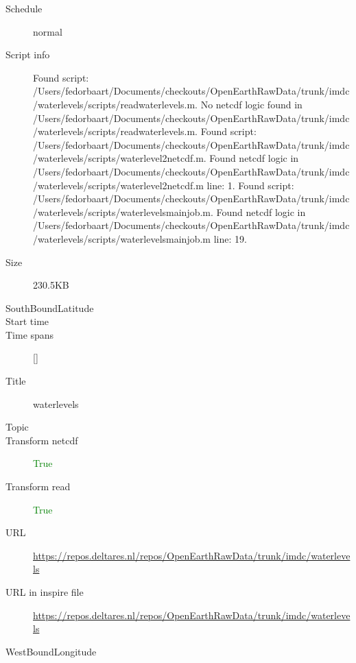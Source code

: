 \documentclass[9]{report}
\begin{document}
\begin{description}
\begin{verbatim}
\end{verbatim}
  \item[Schedule] normal
  \item[Script info] Found script: /Users/fedorbaart/Documents/checkouts/OpenEarthRawData/trunk/imdc/waterlevels/scripts/readwaterlevels.m.
No netcdf logic found in /Users/fedorbaart/Documents/checkouts/OpenEarthRawData/trunk/imdc/waterlevels/scripts/readwaterlevels.m.
Found script: /Users/fedorbaart/Documents/checkouts/OpenEarthRawData/trunk/imdc/waterlevels/scripts/waterlevel2netcdf.m.
Found netcdf logic in /Users/fedorbaart/Documents/checkouts/OpenEarthRawData/trunk/imdc/waterlevels/scripts/waterlevel2netcdf.m line: 1.
Found script: /Users/fedorbaart/Documents/checkouts/OpenEarthRawData/trunk/imdc/waterlevels/scripts/waterlevelsmainjob.m.
Found netcdf logic in /Users/fedorbaart/Documents/checkouts/OpenEarthRawData/trunk/imdc/waterlevels/scripts/waterlevelsmainjob.m line: 19.
  \item[Size] 230.5KB
  \item[SouthBoundLatitude] 
  \item[Start time] 
  \item[Time spans] []
  \item[Title]  waterlevels 
  \item[Topic] 
  \item[Transform netcdf] \textcolor{green}{True}
  \item[Transform read] \textcolor{green}{True}
  \item[URL] \href{https://repos.deltares.nl/repos/OpenEarthRawData/trunk/imdc/waterlevels}{https://repos.deltares.nl/repos/OpenEarthRawData/trunk/imdc/waterlevels}
  \item[URL in inspire file] \href{https://repos.deltares.nl/repos/OpenEarthRawData/trunk/imdc/waterlevels}{https://repos.deltares.nl/repos/OpenEarthRawData/trunk/imdc/waterlevels}
  \item[WestBoundLongitude] 
\end{description}
\end{document}
